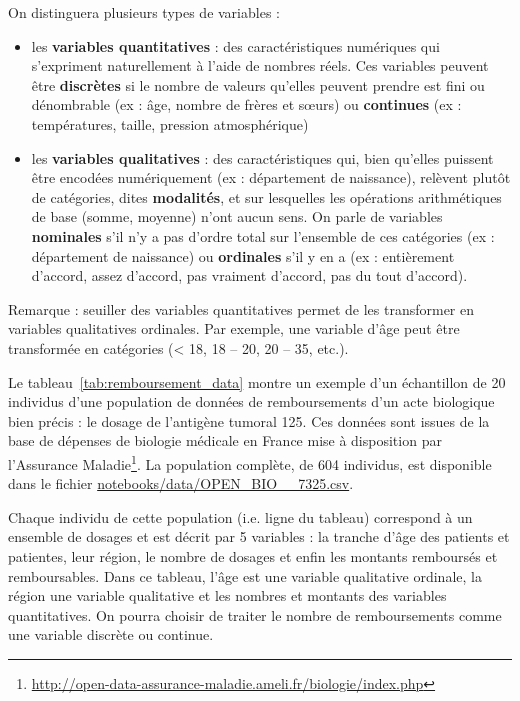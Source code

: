 On distinguera plusieurs types de variables :
\begin{itemize}
	\item les \textbf{variables quantitatives} : des caractéristiques numériques
	qui s'expriment naturellement à l'aide de nombres réels. Ces variables
	peuvent être \textbf{discrètes} si le nombre de valeurs qu'elles peuvent
	prendre est fini ou dénombrable (ex : âge, nombre de frères et s\oe{}urs) ou
	\textbf{continues} (ex : températures, taille, pression atmosphérique)
	\item les \textbf{variables qualitatives} : des caractéristiques qui, bien
	qu'elles puissent être encodées numériquement (ex : département de
	naissance), relèvent plutôt de catégories, dites \textbf{modalités}, et sur lesquelles les opérations
	arithmétiques de base (somme, moyenne) n'ont aucun sens. On parle de
	variables \textbf{nominales} s'il n'y a pas d'ordre total sur l'ensemble de
	ces catégories (ex : département de naissance) ou \textbf{ordinales} s'il y
	en a (ex : entièrement d'accord, assez d'accord, pas vraiment d'accord, pas
	du tout d'accord).
\end{itemize}

Remarque : seuiller des variables quantitatives permet de les transformer en
variables qualitatives ordinales. Par exemple, une variable d'âge peut être
transformée en catégories (< 18, 18 -- 20, 20 -- 35, etc.).

Le tableau~\ref{tab:remboursement_data} montre un exemple d'un échantillon de
20 individus d'une population de données de remboursements d'un acte biologique
bien précis : le dosage de l'antigène tumoral 125. Ces données sont issues de
la base de dépenses de biologie médicale en France mise à disposition par
l'Assurance
Maladie\footnote{\url{http://open-data-assurance-maladie.ameli.fr/biologie/index.php}}. La
population complète, de 604 individus, est disponible dans le fichier \href{https://github.com/chagaz/sdd_2025/blob/main/poly/notebooks/data/OPEN_BIO_2018_7325.csv}{\ttfamily notebooks/\allowbreak data/\allowbreak OPEN\_\allowbreak BIO\_\_\allowbreak 7325.csv}.

Chaque individu de cette population (i.e. ligne du tableau) correspond à un
ensemble de dosages et est décrit par 5 variables : la tranche d'âge des
patients et patientes, leur région, le nombre de dosages et enfin les
montants remboursés et remboursables. Dans ce tableau, l'âge est une variable
qualitative ordinale, la région une variable qualitative et les nombres et
montants des variables quantitatives. On pourra choisir de traiter le nombre de
remboursements comme une variable discrète ou continue.


